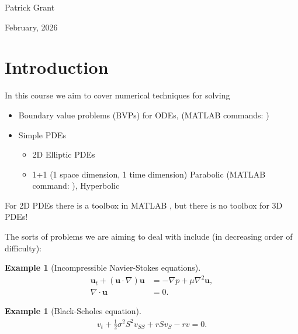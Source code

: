 \documentclass[12pt, a4paper]{article}
\renewcommand{\vec}[1]{\mathbf{#1}}
\theoremstyle{definition}
\newtheorem{example}[thm]{Example}
\theoremstyle{remark}
\numberwithin{equation}{section}
\begin{document}
Patrick Grant

February, 2026
 

\newpage
\tableofcontents



\newpage
\setcounter{page}{1}
\setcounter{section}{-1}
\section{Introduction}
In this course we aim to cover numerical techniques for solving

\begin{itemize}
\item Boundary value problems (BVPs) for ODEs, (MATLAB commands: )
\item Simple PDEs
\begin{itemize}
\item 2D Elliptic PDEs
\item 1+1 (1 space dimension, 1 time dimension) Parabolic (MATLAB command: ), Hyperbolic
\end{itemize}
\end{itemize}

For 2D PDEs there is a toolbox in MATLAB , but there is no toolbox for 3D PDEs!

The sorts of problems we are aiming to deal with include (in decreasing order of difficulty):
\begin{example}[Incompressible Navier-Stokes equations]
\begin{align*}
\vec{u}_t+(\vec{u}\cdot\nabla)\vec{u} &= -\nabla p + \mu\nabla^2\vec{u},\\
\nabla \cdot \vec{u} &= 0.
\end{align*}
\end{example}

\begin{example}[Black-Scholes equation]
\begin{align*}
v_t+\frac{1}{2}\sigma^{2}S^{2}v_{SS}+rSv_{S}-rv=0.
\end{align*}
\end{example}

\newpage
\end{document}
